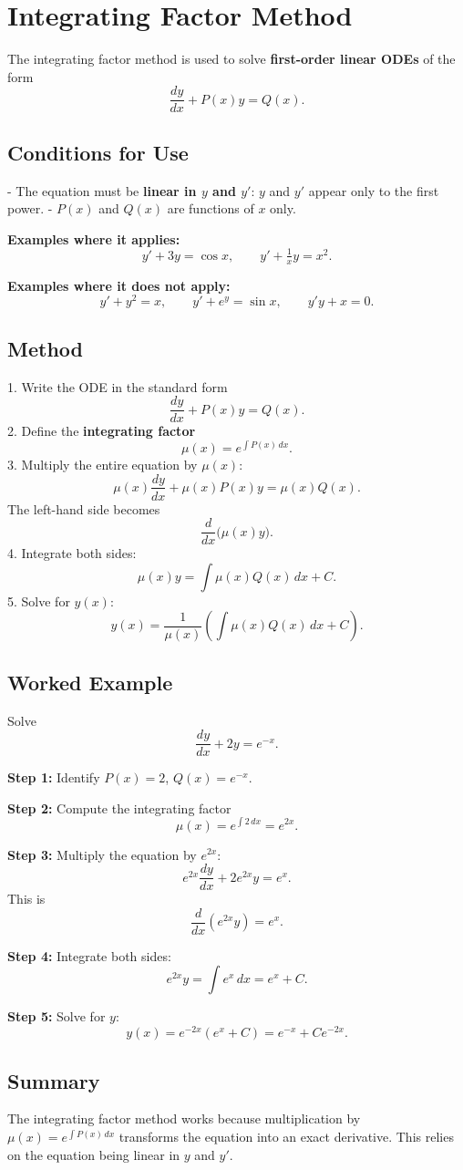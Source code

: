\documentclass[11pt,a4paper]{article}
\begin{document}
	\section*{Integrating Factor Method}
	
	The integrating factor method is used to solve \textbf{first-order linear ODEs} of the form
	$$
	\frac{dy}{dx} + P(x)y = Q(x).
	$$
	
	\subsection*{Conditions for Use}
	- The equation must be \textbf{linear in $y$ and $y'$}:  
	$y$ and $y'$ appear only to the first power.  
	- $P(x)$ and $Q(x)$ are functions of $x$ only.  
	
	\textbf{Examples where it applies:}
	$$
	y' + 3y = \cos x, \qquad y' + \tfrac{1}{x}y = x^2.
	$$
	
	\textbf{Examples where it does not apply:}
	$$
	y' + y^2 = x, \qquad y' + e^y = \sin x, \qquad y'y + x = 0.
	$$
	
	\subsection*{Method}
	1. Write the ODE in the standard form
	$$
	\frac{dy}{dx} + P(x)y = Q(x).
	$$
	2. Define the \textbf{integrating factor}
	$$
	\mu(x) = e^{\int P(x)\,dx}.
	$$
	3. Multiply the entire equation by $\mu(x)$:
	$$
	\mu(x)\frac{dy}{dx} + \mu(x)P(x)y = \mu(x)Q(x).
	$$
	The left-hand side becomes
	$$
	\frac{d}{dx}\big(\mu(x)y\big).
	$$
	4. Integrate both sides:
	$$
	\mu(x)y = \int \mu(x)Q(x)\,dx + C.
	$$
	5. Solve for $y(x)$:
	$$
	y(x) = \frac{1}{\mu(x)}\left(\int \mu(x)Q(x)\,dx + C\right).
	$$
	
	\subsection*{Worked Example}
	Solve
	$$
	\frac{dy}{dx} + 2y = e^{-x}.
	$$
	
	\textbf{Step 1:} Identify $P(x) = 2$, $Q(x) = e^{-x}$.  
	
	\textbf{Step 2:} Compute the integrating factor
	$$
	\mu(x) = e^{\int 2\,dx} = e^{2x}.
	$$
	
	\textbf{Step 3:} Multiply the equation by $e^{2x}$:
	$$
	e^{2x}\frac{dy}{dx} + 2e^{2x}y = e^x.
	$$
	This is
	$$
	\frac{d}{dx}(e^{2x}y) = e^x.
	$$
	
	\textbf{Step 4:} Integrate both sides:
	$$
	e^{2x}y = \int e^x\,dx = e^x + C.
	$$
	
	\textbf{Step 5:} Solve for $y$:
	$$
	y(x) = e^{-2x}(e^x + C) = e^{-x} + Ce^{-2x}.
	$$
	
	\subsection*{Summary}
	The integrating factor method works because multiplication by $\mu(x) = e^{\int P(x)\,dx}$ transforms the equation into an exact derivative. This relies on the equation being linear in $y$ and $y'$.  
	
\end{document}
